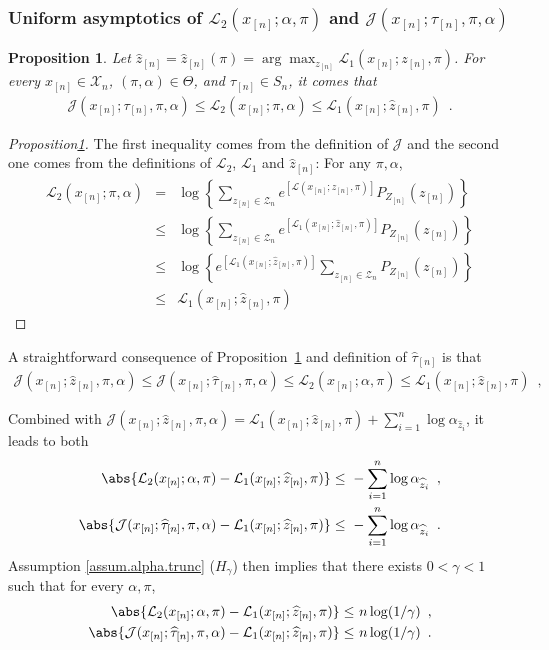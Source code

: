 \documentclass[11pt]{article}
\newtheorem{prop}[thm]{Proposition}
\newtheorem{proof}{Proof}%
\newcommand{\Zdefn}{\mathcal{Z}_{n}}
\newcommand{\Xdefn}{\mathcal{X}_{n}}
\newcommand{\xn}{x_{[n]}}
\newcommand{\Zn}{Z_{[n]}}
\newcommand{\zn}{z_{[n]}}
\newcommand{\taun}{\tau_{[n]}}
\renewcommand{\L}{\mathcal{L}}
\newcommand{\J}{\mathcal{J}}
\newcommand{\znh}{\widehat{z}_{[n]}}
\newcommand{\zh}{\widehat{z}}
\newcommand{\tah}{\widehat{\tau}}
\newcommand{\tahn}{\tah_{[n]}}
\begin{document}
\subsubsection{Uniform asymptotics of $\L_2(\xn; \alpha,\pi)$ and  $\J(\xn; \taun, \pi, \alpha)$}\label{subsubsec.uniform.asymptotics.J.L}

\begin{prop}\label{prop.unif.conv.M2}
Let $\znh =\znh (\pi)=\arg\max_{\zn}\L_1(\xn; \zn, \pi)$. For every $\xn\in\Xdefn$, $(\pi,\alpha) \in \Theta$, and $\taun \in S_n$, it comes that
\begin{align*}
\J(\xn; \taun, \pi, \alpha) \le \L_2(\xn;  \pi, \alpha) \le  \L_1(\xn; \znh,\pi)\enspace.       
\end{align*}
\end{prop}

\begin{proof}[Proposition\ref{prop.unif.conv.M2}]
The first inequality comes from the definition of $\J$ and the second one comes from the definitions of $\L_2$, $\L_1$ and $\znh$:
%
For any $\pi,\alpha$,
\begin{eqnarray*}
\L_2(\xn;  \pi, \alpha) &=& \log \left\{ \sum_{\zn \in \Zdefn} e^{\left[  \L(\xn; \zn,\pi) \right]} P_{\Zn}(\zn) \right\} \\
 & \le & \log \left\{ \sum_{z_{[n]} \in \Zdefn} e^{\left[  \L_1(\xn; \znh,\pi) \right]} P_{\Zn}(\zn) \right\} \\
 & \le & \log \left\{ e^{\left[  \L_1(\xn; \znh,\pi) \right]}  \sum_{z_{[n]} \in \Zdefn}  P_{\Zn}(\zn) \right\} \\
 & \le & \L_1(\xn; \znh,\pi)
 \end{eqnarray*}
        
\end{proof}


A straightforward consequence of Proposition~\ref{prop.unif.conv.M2} and definition of $\tahn$ is that
\begin{align*}
\J(\xn; \znh, \pi, \alpha) \le  \J(\xn; \tahn, \pi, \alpha) \le \L_2(\xn; \alpha, \pi) \le  \L_1(\xn; \znh,\pi)\enspace,        
\end{align*}


Combined with
$\J(\xn; \znh, \pi, \alpha)= \L_1(\xn; \znh, \pi)+\sum_{i=1}^n\log \alpha_{\zh_i}$, it leads to both
\begin{align*}
\abs{\L_2(\xn; \alpha, \pi)-\L_1(\xn; \znh,\pi)} \leq &\ -\sum_{i=1}^n \log \alpha_{\zh_i}\enspace,\\
\abs{\J(\xn; \tahn, \pi, \alpha)-\L_1(\xn; \znh,\pi)} \leq &\ -\sum_{i=1}^n \log \alpha_{\zh_i}\enspace.
\end{align*}
%
Assumption \ref{assum.alpha.trunc} ($H_{\gamma}$) then implies that there exists $0<\gamma<1$ such that
for every $\alpha,\pi$,
\begin{align*}
\abs{\L_2(\xn; \alpha, \pi)-\L_1(\xn; \znh,\pi)} \leq &\ n \log (1/\gamma)\enspace,\\
\abs{\J(\xn; \tahn, \pi, \alpha)-\L_1(\xn; \znh,\pi)} \leq &\ n \log (1/\gamma)\enspace.
\end{align*}
\end{document}
